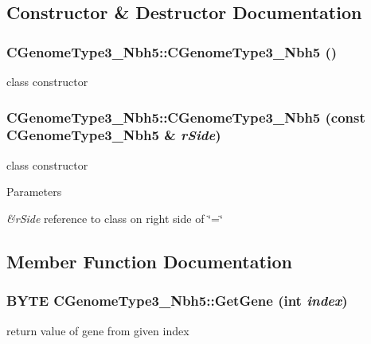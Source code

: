 \subsection{Constructor \& Destructor Documentation}
\hypertarget{classCGenomeType3__Nbh5_aac066e1b9e6a449222640dcf05abe61e}{
\subsubsection[{CGenomeType3\_\-Nbh5}]{\setlength{\rightskip}{0pt plus 5cm}CGenomeType3\_\-Nbh5::CGenomeType3\_\-Nbh5 ()}}
\label{classCGenomeType3__Nbh5_aac066e1b9e6a449222640dcf05abe61e}
class constructor \hypertarget{classCGenomeType3__Nbh5_af9a34e8230071e6e96e3d8abc777126f}{
\subsubsection[{CGenomeType3\_\-Nbh5}]{\setlength{\rightskip}{0pt plus 5cm}CGenomeType3\_\-Nbh5::CGenomeType3\_\-Nbh5 (const {\bf CGenomeType3\_\-Nbh5} \& {\em rSide})}}
\label{classCGenomeType3__Nbh5_af9a34e8230071e6e96e3d8abc777126f}
class constructor


\begin{DoxyParams}{Parameters}
\item[{\em \&rSide}]reference to class on right side of \char`\"{}=\char`\"{} \end{DoxyParams}


\subsection{Member Function Documentation}
\hypertarget{classCGenomeType3__Nbh5_a10f62165a4fc1a9017c5ef10000f87f1}{
\subsubsection[{GetGene}]{\setlength{\rightskip}{0pt plus 5cm}BYTE CGenomeType3\_\-Nbh5::GetGene (int {\em index})}}
\label{classCGenomeType3__Nbh5_a10f62165a4fc1a9017c5ef10000f87f1}
return value of gene from given index


